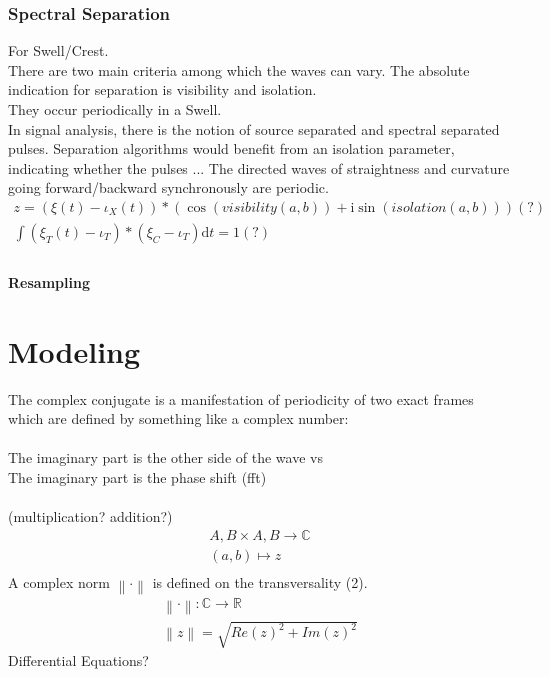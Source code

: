 \documentclass{report}
\newcommand\norm[1]{\left\lVert#1\right\rVert}
\begin{document}
\subsection{Spectral Separation}
For Swell/Crest.\\
There are two main criteria among which the waves can vary. The absolute indication for separation is visibility and isolation.\\
They occur periodically in a Swell.\\
In signal analysis, there is the notion of source separated and spectral separated pulses. Separation algorithms would benefit from an isolation parameter, indicating whether the pulses ...
The directed waves of straightness and curvature going forward/backward synchronously are periodic.
\begin{align}
z =  (\xi(t)-\iota_{X}(t))*(\cos{(visibility(a,b))} +\mathrm{i} \sin{(isolation(a,b))})(?)\\
\int \limits _{}^{} (\xi_{T}(t)-\iota_{T})*(\xi_{C}-\iota_{T})\mathrm{d}t=1(?)
\end{align}
\subsubsection{Resampling}

\chapter{Modeling}

The complex conjugate is a manifestation of periodicity of two exact frames which are defined by something like a complex number:\\\\
The imaginary part is the other side of the wave vs\\
The imaginary part is the phase shift (fft)\\\\
(multiplication? addition?)
\begin{align}
A,B \times A,B \rightarrow \mathbb{C}\\
(a,b) \mapsto z\\
\end{align}
A complex norm $\norm{\cdot}$ is defined on the transversality (2).
\begin{align}
\norm{\cdot} : \mathbb{C} \rightarrow \mathbb{R}\\
\norm{z} = \sqrt{Re(z)^2+Im(z)^2}
\end{align}
Differential Equations?
\end{document}
